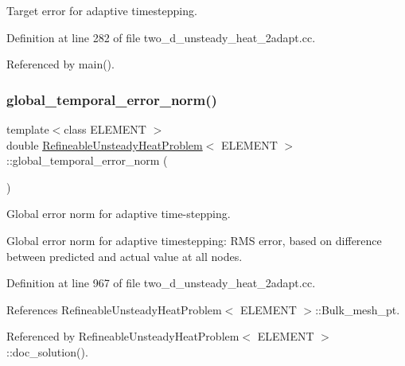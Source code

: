 Target error for adaptive timestepping. 



Definition at line 282 of file two\+\_\+d\+\_\+unsteady\+\_\+heat\+\_\+2adapt.\+cc.



Referenced by main().

\mbox{\label{classRefineableUnsteadyHeatProblem_a8db7ec06bde33713effabef4d4c4018d}} 
\subsubsection{\texorpdfstring{global\+\_\+temporal\+\_\+error\+\_\+norm()}{global\_temporal\_error\_norm()}}
{\footnotesize\ttfamily template$<$class E\+L\+E\+M\+E\+NT $>$ \\
double \hyperlink{classRefineableUnsteadyHeatProblem}{Refineable\+Unsteady\+Heat\+Problem}$<$ E\+L\+E\+M\+E\+NT $>$\+::global\+\_\+temporal\+\_\+error\+\_\+norm (\begin{DoxyParamCaption}{ }\end{DoxyParamCaption})}



Global error norm for adaptive time-\/stepping. 

Global error norm for adaptive timestepping\+: R\+MS error, based on difference between predicted and actual value at all nodes. 

Definition at line 967 of file two\+\_\+d\+\_\+unsteady\+\_\+heat\+\_\+2adapt.\+cc.



References Refineable\+Unsteady\+Heat\+Problem$<$ E\+L\+E\+M\+E\+N\+T $>$\+::\+Bulk\+\_\+mesh\+\_\+pt.



Referenced by Refineable\+Unsteady\+Heat\+Problem$<$ E\+L\+E\+M\+E\+N\+T $>$\+::doc\+\_\+solution().

\mbox{\label{classRefineableUnsteadyHeatProblem_af33179cc377ae40e4d229aebcd8ade8e}} 

